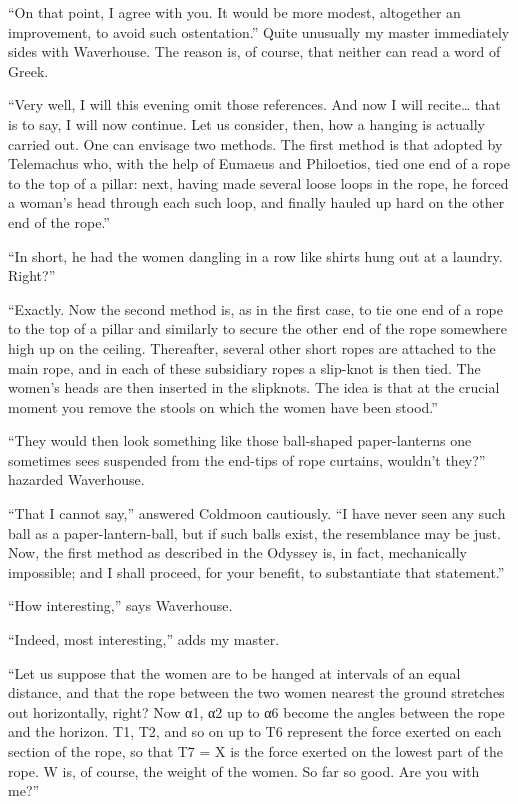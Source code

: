 \documentclass[12pt, openright]{book}
\begin{document}
``On that point, I agree with you. It would be more modest, altogether
an improvement, to avoid such ostentation.'' Quite unusually my master
immediately sides with Waverhouse. The reason is, of course, that
neither can read a word of Greek.

``Very well, I will this evening omit those references. And now I will
recite\ldots{} that is to say, I will now continue. Let us consider,
then, how a hanging is actually carried out. One can envisage two
methods. The first method is that adopted by Telemachus who, with the
help of Eumaeus and Philoetios, tied one end of a rope to the top of a
pillar: next, having made several loose loops in the rope, he forced a
woman's head through each such loop, and finally hauled up hard on the
other end of the rope.''

``In short, he had the women dangling in a row like shirts hung out at a
laundry. Right?''

``Exactly. Now the second method is, as in the first case, to tie one
end of a rope to the top of a pillar and similarly to secure the other
end of the rope somewhere high up on the ceiling. Thereafter, several
other short ropes are attached to the main rope, and in each of these
subsidiary ropes a slip-knot is then tied. The women's heads are then
inserted in the slipknots. The idea is that at the crucial moment you
remove the stools on which the women have been stood.''

``They would then look something like those ball-shaped paper-lanterns
one sometimes sees suspended from the end-tips of rope curtains,
wouldn't they?'' hazarded Waverhouse.

``That I cannot say,'' answered Coldmoon cautiously. ``I have never seen
any such ball as a paper-lantern-ball, but if such balls exist, the
resemblance may be just. Now, the first method as described in the
Odyssey is, in fact, mechanically impossible; and I shall proceed, for
your benefit, to substantiate that statement.''

``How interesting,'' says Waverhouse.

``Indeed, most interesting,'' adds my master.

``Let us suppose that the women are to be hanged at intervals of an
equal distance, and that the rope between the two women nearest the
ground stretches out horizontally, right? Now α1, α2 up to α6 become the
angles between the rope and the horizon. T1, T2, and so on up to T6
represent the force exerted on each section of the rope, so that T7 = X
is the force exerted on the lowest part of the rope. W is, of course,
the weight of the women. So far so good. Are you with me?''
\end{document}
